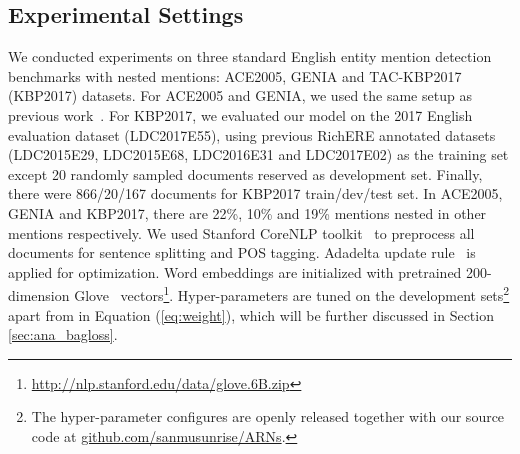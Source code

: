 \documentclass[11pt,a4paper]{article}
\begin{document}
\subsection{Experimental Settings}
We conducted experiments on three standard English entity mention detection benchmarks with nested mentions: ACE2005, GENIA and TAC-KBP2017 (KBP2017) datasets. For ACE2005 and GENIA, we used the same setup as previous work~\cite{N18-1131,D18-1124,D18-1019,N18-1079}. For KBP2017, we evaluated our model on the 2017 English evaluation dataset (LDC2017E55), using previous RichERE annotated datasets (LDC2015E29, LDC2015E68, LDC2016E31 and LDC2017E02) as the training set except 20 randomly sampled documents reserved as development set. Finally, there were 866/20/167 documents for KBP2017 train/dev/test set. In ACE2005, GENIA and KBP2017, there are 22\%, 10\% and 19\% mentions nested in other mentions respectively. We used Stanford CoreNLP toolkit~\cite{manning2014stanford} to preprocess all documents for sentence splitting and POS tagging. Adadelta update rule~\cite{zeiler2012adadelta} is applied for optimization. Word embeddings are initialized with pretrained 200-dimension Glove~\cite{pennington2014glove} vectors\footnote{\url{http://nlp.stanford.edu/data/glove.6B.zip}}. Hyper-parameters are tuned on the development sets\footnote{The hyper-parameter configures are openly released together with our source code at \url{github.com/sanmusunrise/ARNs}.} apart from  in Equation (\ref{eq:weight}), which will be further discussed in Section \ref{sec:ana_bagloss}.
\end{document}
